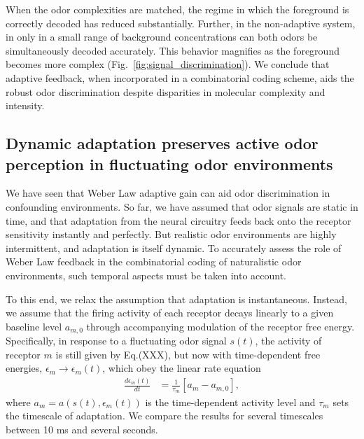 When the odor complexities are matched, the regime in which the foreground is correctly decoded has reduced substantially. Further, in the non-adaptive system, in only in a small range of background concentrations can both odors be simultaneously decoded accurately. This behavior magnifies as the foreground becomes more complex (Fig.~\ref{fig:signal_discrimination}). We conclude that adaptive feedback, when incorporated in a combinatorial coding scheme, aids the robust odor discrimination despite disparities in molecular complexity and intensity. 

\subsection{Dynamic adaptation preserves active odor perception in fluctuating odor environments}
We have seen that Weber Law adaptive gain can aid odor discrimination in confounding environments. So far, we have assumed that odor signals are static in time, and that adaptation from the neural circuitry feeds back onto the receptor sensitivity instantly and perfectly. But realistic odor environments are highly intermittent, and adaptation is itself dynamic. To accurately assess the role of Weber Law feedback in the combinatorial coding of naturalistic odor environments, such temporal aspects must be taken into account. 

To this end, we relax the assumption that adaptation is instantaneous. Instead, we assume that the firing activity of each receptor decays linearly to a given baseline level $a_{m, 0}$ through accompanying modulation of the receptor free energy. Specifically, in response to a fluctuating odor signal $s(t)$, the activity of receptor $m$ is still given by Eq.(XXX), but now with time-dependent free energies, $\epsilon_m \rightarrow \epsilon_m(t)$, which obey the linear rate equation
\begin{align}
\frac{d\epsilon_m(t)}{dt} &= \frac{1}{\tau_m}\left[a_m - a_{m,0}\right],
\end{align}
where $a_m = a(s(t), \epsilon_m(t))$ is the time-dependent activity level and $\tau_m$ sets the timescale of adaptation. We compare the results for several timescales between 10 ms and several seconds.

